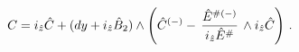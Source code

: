 \begin{equation}
\label{rC=} 
C= i_{\hat{z}}\hat{C} + (dy +i_{\hat{z}} \hat{B}_2) \wedge 
\left(\hat{C}^{(-)} -  \,
{\hat{E}^{ {\#}(-)}\over i_{\hat{z}}\hat{E}^{ {\#}}}\, 
\wedge 
i_{\hat{z}} \hat{C} \right)\, .
\end{equation}

